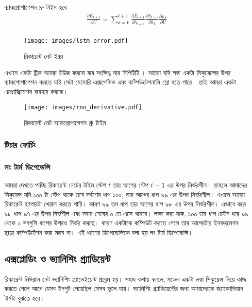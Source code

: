 ব্যাকপ্রোপাগেশন থ্রু টাইম হবে - 
\begin{align} %
   \frac {\partial E_{t+1}} {\partial U} = \sum _{k=0} ^{t+1} \frac {\partial E_{t+1}} { \partial h_{t+1}} \frac {\partial h_{t+1}} { \partial h_k} \frac {\partial h_k} { \partial U} \\
\end{align}



\begin{figure}[htbp] %
   \centering
   \texttt{[image: images/lstm\_error.pdf]} 
   \caption{রিকারেন্ট নেট ইরর}
   \label{fig:rnn_error}
\end{figure} 


এখানে একটা ট্রিক আমরা ইউজ করবো যার সংক্ষিপ্ত নাম বিপিটিটি \cite{58337}। আমরা যদি লম্বা একটা সিকুয়েন্সের উপর ব্যাকপোপাগেশন করতে যাই সেটা মেমোরি এক্সপেন্সিভ এবং কম্পিউটেশনালি স্লো হতে পারে।
তাই আমরা একটা এপ্রোক্সিমেশন ব্যবহার করবো। 


\begin{figure}[htbp] %
   \centering
   \texttt{[image: images/rnn\_derivative.pdf]} 
   \caption{রিকারেন্ট নেট ব্যাকপ্রোপাগেশন থ্রু টাইম}
   \label{fig:rnn_derivative}
\end{figure} 

\subsubsection{টিচার ফোর্চিং}
\subsubsection{লং টার্ম ডিপেন্ডেন্সি}
আমরা দেখতে পাচ্ছি রিকারেন্ট নেটের টাইম স্টেপ $t$ তার আগের স্টেপ $t-1$ এর উপর নির্ভরশীল। তাহলে আমাদের সিকুয়েন্স যদি ১০০ টা স্টেপ থাকে তবে সর্বশেষ ধাপ ১০০, তার আগের ধাপ 
৯৯ এর উপর নির্ভরশীল। এখানে আমরা রিকারেন্ট ব্যাপারটা খেয়াল করতে পারি। কারণ ৯৯ তম ধাপ তার আগের ধাপ ৯৮ এর উপর নির্ভরশীল। এভাবে করে ৯৮ ধাপ ৯৭ এর উপর নির্ভশীল এবং 
সবার শেষের ০ তে এসে থামবে। লক্ষ্য করা যাক, ১০০ তম ধাপ চেইন ধরে ৯৯ থেকে ০ সবগুলি ধাপের উপরও নির্ভর করছে। কারণ একটাকে কম্পিউট করতে গেলে তার আগেরটার ইনফরমেশন ছাড়া 
কম্পিউটেশন করা সম্ভব না। এই ধরণের ডিপেন্ডেন্সিকে বলা হয় লং টার্ম ডিপেন্ডেন্সি। 

\subsection{এক্সপ্লোডিং ও ভ্যানিশিং গ্র্যাডিয়েন্ট}
রিকারেন্ট নিউরাল নেট ভ্যানিশিং গ্র্যাডেইয়েন্ট প্রব্লেম হয়। সহজ কথায় বললে, মডেল একটা লম্বা সিকুয়েন্স নিয়ে কাজ করতে গেলে আগে যেসব ইনপুট পেয়েছিল সেসব ভুলে যায়।
ভ্যানিশিং গ্র্যাডিয়েন্টের জন্য আমাদেরকে জ্যাকোভিয়ান টার্মটা বুঝতে হবে। 

